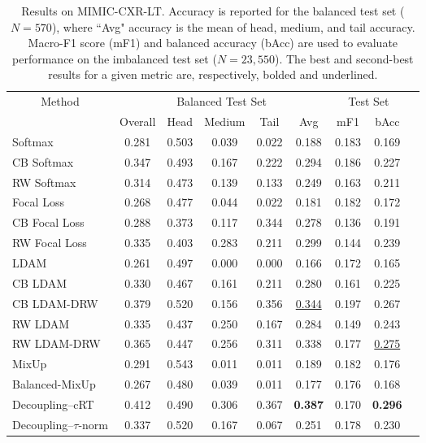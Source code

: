 \documentclass[runningheads]{llncs}
\begin{document}
\begin{table}[!ht]
    \centering
\renewcommand{\arraystretch}{1.1}
    \caption{Results on MIMIC-CXR-LT. Accuracy is reported for the balanced test set ($N=570$), where ``Avg" accuracy is the mean of head, medium, and tail accuracy. Macro-F1 score (mF1) and balanced accuracy (bAcc) are used to evaluate performance on the imbalanced test set ($N=23,550$). The best and second-best results for a given metric are, respectively, bolded and underlined.}
    \begin{tabular}{@{}lcccccccc@{}}
        \toprule
        \multicolumn{1}{c}{Method} & \multicolumn{5}{c}{Balanced Test Set} & \multicolumn{2}{c}{Test Set} \\
        \cmidrule(lr){2-6} \cmidrule(lr){7-8}
         & Overall & Head & Medium & Tail & Avg & mF1 & bAcc \\
\midrule
            Softmax & 0.281 & 0.503 & 0.039 & 0.022 & 0.188 & 0.183 & 0.169 \\
            CB Softmax & 0.347 & 0.493 & 0.167 & 0.222 & 0.294 & 0.186 & 0.227 \\
            RW Softmax & 0.314 & 0.473 & 0.139 & 0.133 & 0.249 & 0.163 & 0.211 \\
            Focal Loss & 0.268 & 0.477 & 0.044 & 0.022 & 0.181 & 0.182 & 0.172 \\
            CB Focal Loss & 0.288 & 0.373 & 0.117 & 0.344 & 0.278 & 0.136 & 0.191 \\
            RW Focal Loss & 0.335 & 0.403 & 0.283 & 0.211 & 0.299 & 0.144 & 0.239 \\
            LDAM & 0.261 & 0.497 & 0.000   & 0.000   & 0.166 & 0.172 & 0.165 \\
            CB LDAM & 0.330  & 0.467 & 0.161 & 0.211 & 0.280  & 0.161 & 0.225 \\
            CB LDAM-DRW & 0.379 & 0.520  & 0.156 & 0.356 & \underline{0.344} & 0.197 & 0.267 \\
            RW LDAM & 0.335 & 0.437 & 0.250  & 0.167 & 0.284 & 0.149 & 0.243 \\
            RW LDAM-DRW & 0.365 & 0.447 & 0.256 & 0.311 & 0.338 & 0.177 & \underline{0.275} \\
            MixUp & 0.291 & 0.543 & 0.011 & 0.011 & 0.189 & 0.182 & 0.176 \\
            Balanced-MixUp & 0.267 & 0.480  & 0.039 & 0.011 & 0.177 & 0.176 & 0.168 \\
            Decoupling--cRT & 0.412 & 0.490  & 0.306 & 0.367 & \textbf{0.387} & 0.170  & \textbf{0.296} \\
            Decoupling--$\tau$-norm & 0.337 & 0.520  & 0.167 & 0.067 & 0.251 & 0.178 &         0.230  \\
        \bottomrule
    \end{tabular}
    \label{results:mimic}
\end{table}
\end{document}
